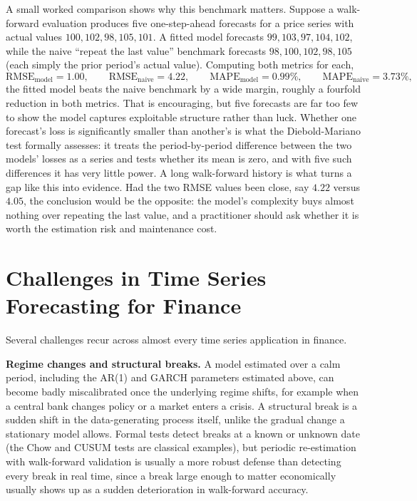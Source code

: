 \documentclass[../ai_in_finance]{subfiles}
\begin{document}
A small worked comparison shows why this benchmark matters. Suppose a walk-forward evaluation produces five one-step-ahead forecasts for a price series with actual values $100, 102, 98, 105, 101$. A fitted model forecasts $99, 103, 97, 104, 102$, while the naive ``repeat the last value'' benchmark forecasts $98, 100, 102, 98, 105$ (each simply the prior period's actual value). Computing both metrics for each,
\begin{equation*}
\text{RMSE}_{\text{model}} = 1.00, \qquad \text{RMSE}_{\text{naive}} = 4.22, \qquad \text{MAPE}_{\text{model}} = 0.99\%, \qquad \text{MAPE}_{\text{naive}} = 3.73\%,
\end{equation*}
the fitted model beats the naive benchmark by a wide margin, roughly a fourfold reduction in both metrics. That is encouraging, but five forecasts are far too few to show the model captures exploitable structure rather than luck. Whether one forecast's loss is significantly smaller than another's is what the Diebold-Mariano test formally assesses: it treats the period-by-period difference between the two models' losses as a series and tests whether its mean is zero, and with five such differences it has very little power. A long walk-forward history is what turns a gap like this into evidence. Had the two RMSE values been close, say $4.22$ versus $4.05$, the conclusion would be the opposite: the model's complexity buys almost nothing over repeating the last value, and a practitioner should ask whether it is worth the estimation risk and maintenance cost.

\section{Challenges in Time Series Forecasting for Finance}

Several challenges recur across almost every time series application in finance.

\textbf{Regime changes and structural breaks.} A model estimated over a calm period, including the AR(1) and GARCH parameters estimated above, can become badly miscalibrated once the underlying regime shifts, for example when a central bank changes policy or a market enters a crisis. A structural break is a sudden shift in the data-generating process itself, unlike the gradual change a stationary model allows.
Formal tests detect breaks at a known or unknown date (the Chow and CUSUM tests are classical examples), but periodic re-estimation with walk-forward validation is usually a more robust defense than detecting every break in real time, since a break large enough to matter economically usually shows up as a sudden deterioration in walk-forward accuracy.
\end{document}

